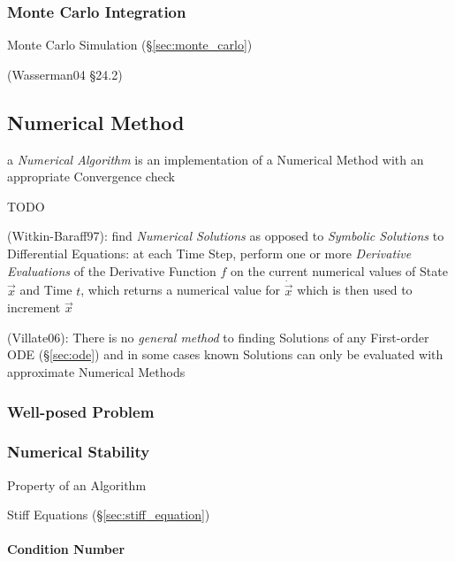 \subsubsection{Monte Carlo Integration}\label{sec:monte_carlo_integration}

Monte Carlo Simulation (\S\ref{sec:monte_carlo})

(Wasserman04 \S24.2)



\subsection{Numerical Method}\label{sec:numerical_method}

a \emph{Numerical Algorithm} is an implementation of a Numerical Method with an
appropriate Convergence check

TODO

(Witkin-Baraff97): find \emph{Numerical Solutions} as opposed to \emph{Symbolic
  Solutions} to Differential Equations: at each Time Step, perform one or more
\emph{Derivative Evaluations} of the Derivative Function $f$ on the current
numerical values of State $\vec{x}$ and Time $t$, which returns a numerical
value for $\dot{\vec{x}}$ which is then used to increment $\vec{x}$

(Villate06): There is no \emph{general method} to finding Solutions of any
First-order ODE (\S\ref{sec:ode}) and in some cases known Solutions can only be
evaluated with approximate Numerical Methods



\subsubsection{Well-posed Problem}\label{sec:well_posed}

\subsubsection{Numerical Stability}\label{sec:numerical_stability}

Property of an Algorithm

Stiff Equations (\S\ref{sec:stiff_equation})



\paragraph{Condition Number}\label{sec:condition_number}\hfill

